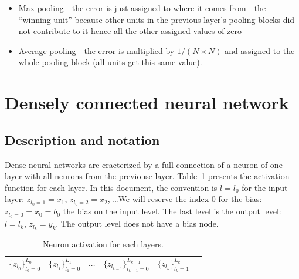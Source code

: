 \documentclass[final, paper=letter,5p,times,twocolumn]{elsarticle}
\begin{document}
\begin{itemize}
    \item Max-pooling - the error is just assigned to where it comes from - the “winning unit” because other units in the previous layer’s pooling blocks did not contribute to it hence all the other assigned values of zero
    \item Average pooling - the error is multiplied by $1 / (N \times N)$ and assigned to the whole pooling block (all units get this same value).
\end{itemize}

\section{Densely connected neural network}
\subsection{Description and notation}

Dense neural networks are cracterized by a full connection of a neuron of one layer with all neurons from the previouse layer. Table~\ref{Layers_activations} presents the activation function for each layer. In this document, the convention is $l = l_{0}$ for the input layer: $z_{l_{0} = 1} = x_{1}$, $z_{l_{0} = 2} = x_{2}$, \dots We will reserve the index 0 for the bias: $z_{l_{0} = 0} = x_{0} = b_{0}$ the bias on the input level. The last level is the output level: $l = l_{k}$, $z_{l_{k}} = y_{k}$. The output level does not have a bias node.

\begin{table}[]
\centering
\caption{Neuron activation for each layers.}
\label{Layers_activations}
\begin{tabular}{llllll}
 $\{ z_{l_{0}}\}_{l_{0} = 0}^{L_{0}}$&  $\{ z_{l_{1}}\}_{l_{1} = 0}^{L_{1}}$ &  $\cdots$ & $\{ z_{l_{k-1}}\}_{l_{k-1} = 0}^{L_{k-1}}$ &  $\{ z_{l_{k}}\}_{l_{k} = 1}^{L_{k}}$ &  \\ 
\end{tabular}
\end{table}
\end{document}
